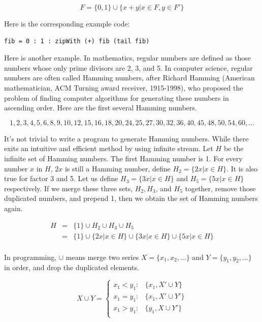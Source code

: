\documentclass{article}
\begin{document}
\[
F = \{0, 1\} \cup \{ x + y | x \in F, y \in F'\}
\]

Here is the corresponding example code:
\begin{lstlisting}
fib = 0 : 1 : zipWith (+) fib (tail fib)
\end{lstlisting}

 
Here is another example. In mathematics, regular numbers are defined as those numbers whose only prime divisors are 2, 3, and 5. In computer science, regular numbers are often called Hamming numbers, after Richard Hamming (American mathematician, ACM Turning award receiver, 1915-1998), who proposed the problem of finding computer algorithms for generating these numbers in ascending order. Here are the first several Hamming numbers.

\[
1, 2, 3, 4, 5, 6, 8, 9, 10, 12, 15, 16, 18, 20, 24, 25, 27, 30, 32, 36, 40, 45, 48, 50, 54, 60, ...
\]

It's not trivial to write a program to generate Hamming numbers. While there exits an intuitive and efficient method by using infinite stream. Let $H$ be the infinite set of Hamming numbers. The first Hamming number is 1. For every number $x$ in $H$, $2x$ is still a Hamming number, define $H_2 = \{ 2x | x \in H \}$. It is also true for factor 3 and 5. Let us define $H_3 = \{ 3x | x \in H \}$ and $H_5 = \{ 5x | x \in H \}$ respectively. If we merge these three sets, $H_2, H_3$, and $H_5$ together, remove those duplicated numbers, and prepend 1, then we obtain the set of Hamming numbers again.

\[
\begin{array}{rcl}
H & = & \{ 1 \} \cup H_2 \cup H_3 \cup H_5 \\
  & = & \{ 1 \} \cup \{ 2x | x \in H \} \cup \{ 3x | x \in H \} \cup \{ 5x | x \in H \} \\
\end{array}
\]

In programming, $\cup$ means merge two series $X = \{x_1, x_2, ...\}$ and $Y = \{y_1, y_2, ...\}$ in order, and drop the duplicated elements.

\[
X \cup Y =
\begin{cases}
x_1 < y_1 : & \{x_1, X' \cup Y \} \\
x_1 = y_1 : & \{x_1, X' \cup Y' \} \\
x_1 > y_1 : & \{y_1, X \cup Y' \} \\
\end{cases}
\]
\end{document}
